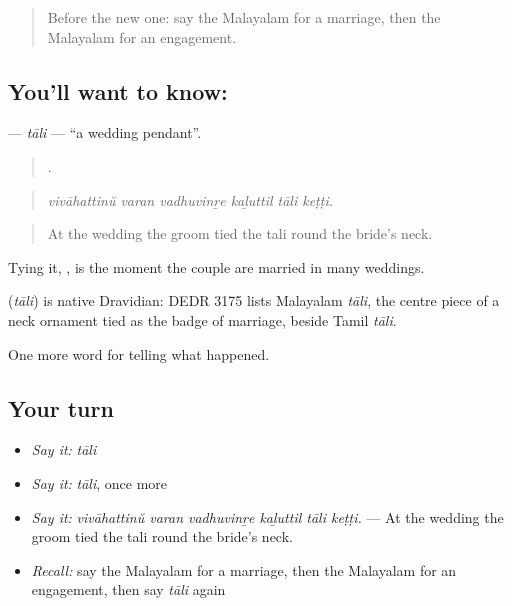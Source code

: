 \label{lesson:ML-C385-tali}



\begin{quote}
Before the new one: say the Malayalam for a marriage, then the Malayalam for an engagement.
\end{quote}

\subsection*{You'll want to know: }
\textbf{} — \emph{tāli} — \textquotedblleft{}a wedding pendant\textquotedblright{}.

\begin{quote}
     .
\end{quote}

\begin{quote}
\emph{vivāhattinŭ varan vadhuvinṟe kaḻuttil tāli keṭṭi.}
\end{quote}

\begin{quote}
At the wedding the groom tied the tali round the bride's neck.
\end{quote}

Tying it,  , is the moment the couple are married in many weddings.

\begin{cousinweb}
\textbf{} (\emph{tāli}) is native Dravidian: DEDR 3175 lists Malayalam \emph{tāli}, the centre piece of a neck ornament tied as the badge of marriage, beside Tamil \emph{tāli}.
\end{cousinweb}

\begin{grammarlens}[title={What you've built}]
One more word for telling what happened.
\end{grammarlens}

\subsection*{Your turn}
\begin{itemize}
\raggedright
  \item \emph{Say it:} \emph{tāli}
  \item \emph{Say it:} \emph{tāli}, once more
  \item \emph{Say it:} \emph{vivāhattinŭ varan vadhuvinṟe kaḻuttil tāli keṭṭi.} — At the wedding the groom tied the tali round the bride's neck.
  \item \emph{Recall:} say the Malayalam for a marriage, then the Malayalam for an engagement, then say \emph{tāli} again
\end{itemize}

